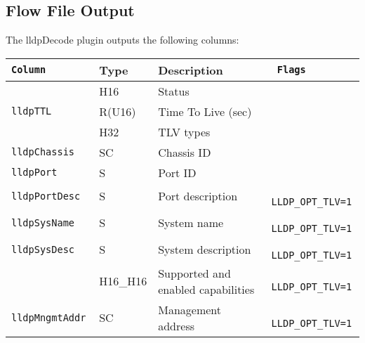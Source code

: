 \documentclass[documentation]{subfiles}
\begin{document}
\subsection{Flow File Output}
The lldpDecode plugin outputs the following columns:
\begin{longtable}{>{\tt}lll>{\tt\small}l}
    \toprule
    {\bf Column}           & {\bf Type} & {\bf Description}                  & {\bf Flags}\\
    \midrule\endhead%
    \nameref{lldpStat}     & H16        & Status                             & \\
    lldpTTL                & R(U16)     & Time To Live (sec)                 & \\
    \nameref{lldpTLVTypes} & H32        & TLV types                          & \\
    lldpChassis            & SC         & Chassis ID                         & \\
    lldpPort               & S          & Port ID                            & \\
    lldpPortDesc           & S          & Port description                   & LLDP\_OPT\_TLV=1\\
    lldpSysName            & S          & System name                        & LLDP\_OPT\_TLV=1\\
    lldpSysDesc            & S          & System description                 & LLDP\_OPT\_TLV=1\\
    \nameref{lldpCaps}     & H16\_H16   & Supported and enabled capabilities & LLDP\_OPT\_TLV=1\\
    lldpMngmtAddr          & SC         & Management address                 & LLDP\_OPT\_TLV=1\\
    \bottomrule
\end{longtable}
\end{document}
